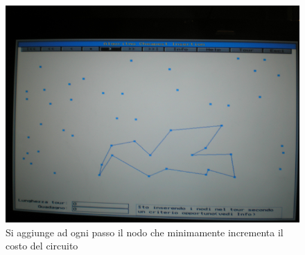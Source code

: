 \documentclass{article}
\begin{document}
    \begin{figure}[H]
        \centering
        \includegraphics[scale=0.5]{images/cheap_ins2.png}
        \caption{Si aggiunge ad ogni passo il nodo che minimamente incrementa il costo del circuito}
    \end{figure}
\end{document}
